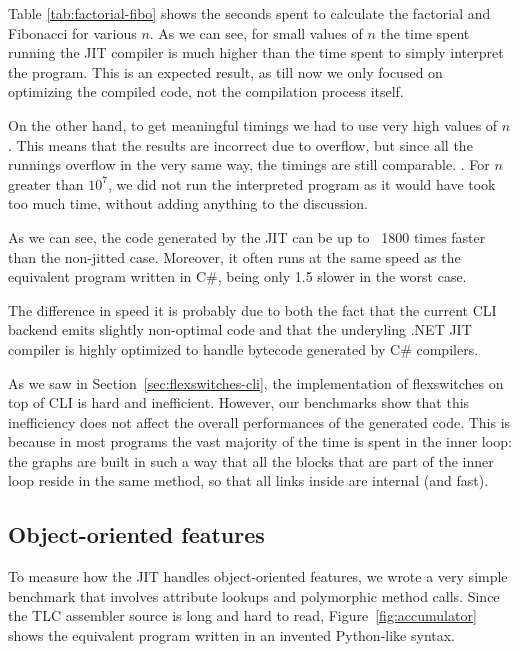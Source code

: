 Table \ref{tab:factorial-fibo} shows the seconds spent to calculate
the factorial and Fibonacci for various $n$.  As we can see, for small values
of $n$ the time spent running the JIT compiler is much higher than the time
spent to simply interpret the program.  This is an expected result, as till
now we only focused on optimizing the compiled code, not the compilation
process itself.

On the other hand, to get meaningful timings we had to use very high values of
$n$.  This means that the results are incorrect due to overflow, but since all
the runnings overflow in the very same way, the timings are still
comparable. .  For $n$ greater
than $10^7$, we did not run the interpreted program as it would have took too
much time, without adding anything to the discussion.

As we can see, the code generated by the JIT can be up to ~1800 times faster
than the non-jitted case.  Moreover, it often runs at the same speed as the
equivalent program written in C\#, being only 1.5 slower in the worst case.

The difference in speed it is probably due to both the fact that the current
CLI backend emits slightly non-optimal code and that the underyling .NET JIT
compiler is highly optimized to handle bytecode generated by C\# compilers.

As we saw in Section~\ref{sec:flexswitches-cli}, the implementation of
flexswitches on top of CLI is hard and inefficient.  However, our benchmarks
show that this inefficiency does not affect the overall performances of the
generated code.  This is because in most programs the vast majority of the
time is spent in the inner loop: the graphs are built in such a way that all
the blocks that are part of the inner loop reside in the same method, so that
all links inside are internal (and fast).


\subsection{Object-oriented features}

To measure how the JIT handles object-oriented features, we wrote a very
simple benchmark that involves attribute lookups and polymorphic method calls.
Since the TLC assembler source is long and hard to read,
Figure~\ref{fig:accumulator} shows the equivalent program written in an
invented Python-like syntax.

